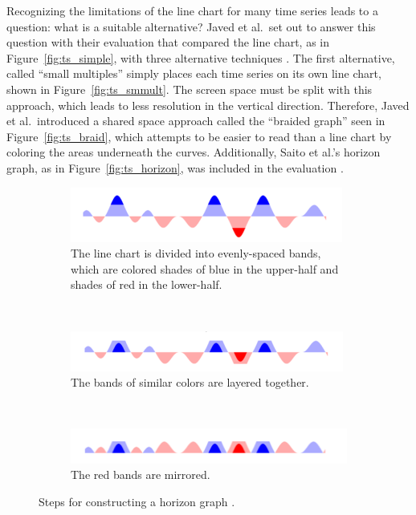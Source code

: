 \documentclass{article}
\begin{document}
Recognizing the limitations of the line chart for many time series leads to a question: what is a suitable alternative?  Javed et al.\ set out to answer this question with their evaluation that compared the line chart, as in Figure~\ref{fig:ts_simple}, with three alternative techniques  \cite{javed2010}.  The first alternative, called ``small multiples'' simply places each time series on its own line chart, shown in Figure~\ref{fig:ts_smmult}.  The screen space must be split with this approach, which leads to less resolution in the vertical direction.  Therefore, Javed et al.\ introduced a shared space approach called the ``braided graph'' seen in Figure~\ref{fig:ts_braid}, which attempts to be easier to read than a line chart by coloring the areas underneath the curves.  Additionally, Saito et al.'s horizon graph, as in Figure~\ref{fig:ts_horizon}, was included in the evaluation \cite{saito2005}.

\begin{figure}
        \centering
        \begin{subfigure}[b]{0.5\textwidth}
                \includegraphics[width=\textwidth]{figures/construction1.png}
                \caption{The line chart is divided into evenly-spaced bands, which are colored shades of blue in the upper-half and shades of red in the lower-half.}
                \label{fig:construction1}
        \end{subfigure}
        \\ 
        \begin{subfigure}[b]{0.5\textwidth}
                \includegraphics[width=\textwidth]{figures/construction2.png}
                \caption{The bands of similar colors are layered together.}
                \label{fig:construction2}
        \end{subfigure}
        \\
        \begin{subfigure}[b]{0.5\textwidth}
                \includegraphics[width=\textwidth]{figures/construction3.png}
                \caption{The red bands are mirrored.}
                \label{fig:construction3}
        \end{subfigure}
        \caption{Steps for constructing a horizon graph \cite{heer2009}.}
        \label{fig:hg_construction}
\end{figure}
\end{document}
